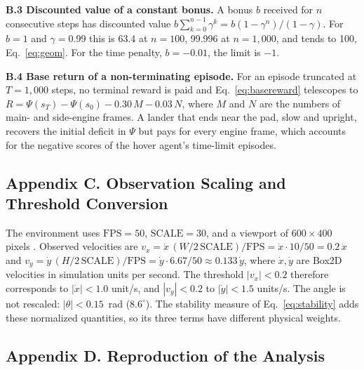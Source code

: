 \documentclass[11pt,a4paper]{article}
\begin{document}
\textbf{B.3 Discounted value of a constant bonus.} A bonus $b$ received for $n$ consecutive steps has discounted value $b\sum_{k=0}^{n-1}\gamma^k = b(1-\gamma^n)/(1-\gamma)$. For $b=1$ and $\gamma=0.99$ this is 63.4 at $n=100$, 99.996 at $n=1{,}000$, and tends to 100, Eq.~\eqref{eq:geom}. For the time penalty, $b=-0.01$, the limit is $-1$.

\textbf{B.4 Base return of a non-terminating episode.} For an episode truncated at $T=1{,}000$ steps, no terminal reward is paid and Eq.~\eqref{eq:basereward} telescopes to $R=\Psi(s_T)-\Psi(s_0)-0.30\,M-0.03\,N$, where $M$ and $N$ are the numbers of main- and side-engine frames. A lander that ends near the pad, slow and upright, recovers the initial deficit in $\Psi$ but pays for every engine frame, which accounts for the negative scores of the hover agent's time-limit episodes.

\subsection*{Appendix C. Observation Scaling and Threshold Conversion}

The environment uses $\text{FPS}=50$, $\text{SCALE}=30$, and a viewport of $600\times400$ pixels \cite{gymSource}. Observed velocities are $v_x = \dot x\,(W/2\,\text{SCALE})/\text{FPS} = \dot x\cdot10/50 = 0.2\,\dot x$ and $v_y = \dot y\,(H/2\,\text{SCALE})/\text{FPS} = \dot y\cdot6.67/50 \approx 0.133\,\dot y$, where $\dot x,\dot y$ are Box2D velocities in simulation units per second. The threshold $|v_x|<0.2$ therefore corresponds to $|\dot x|<1.0$ unit/s, and $|v_y|<0.2$ to $|\dot y|<1.5$ units/s. The angle is not rescaled: $|\theta|<0.15$~rad ($8.6^\circ$). The stability measure of Eq.~\eqref{eq:stability} adds these normalized quantities, so its three terms have different physical weights.

\subsection*{Appendix D. Reproduction of the Analysis}
\end{document}
